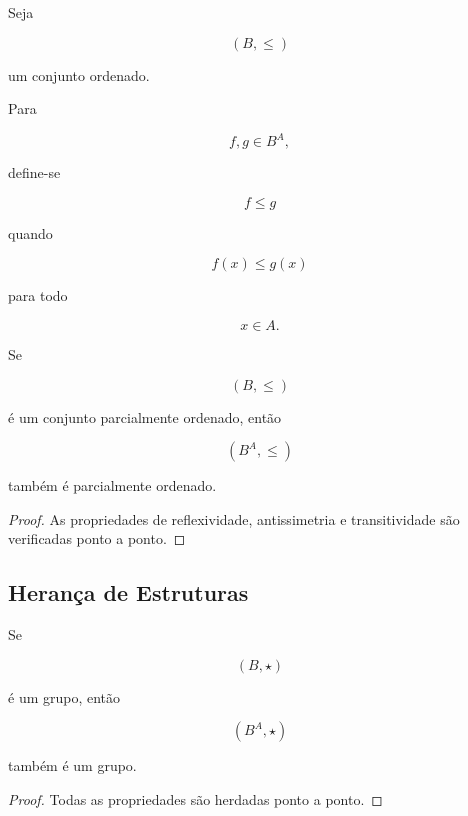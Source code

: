 \documentclass[../../main]{subfiles}
\begin{document}
\begin{defn}
	\label{def:matematica:funcoes:operacoes:ordem}

	Seja

	\[
		(B,\le)
	\]

	um conjunto ordenado.

	Para

	\[
		f,g\in B^A,
	\]

	define-se

	\[
		f\le g
	\]

	quando

	\[
		f(x)\le g(x)
	\]

	para todo

	\[
		x\in A.
	\]

\end{defn}

\begin{prop}
	\label{prop:matematica:funcoes:operacoes:ordem-parcial}

	Se

	\[
		(B,\le)
	\]

	é um conjunto parcialmente ordenado, então

	\[
		(B^A,\le)
	\]

	também é parcialmente ordenado.

\end{prop}

\begin{proof}

	As propriedades de reflexividade, antissimetria e transitividade são
	verificadas ponto a ponto.

\end{proof}

\subsection{Herança de Estruturas}

\begin{prop}
	\label{prop:matematica:funcoes:operacoes:grupo}

	Se

	\[
		(B,\star)
	\]

	é um grupo, então

	\[
		(B^A,\star)
	\]

	também é um grupo.

\end{prop}

\begin{proof}

	Todas as propriedades são herdadas ponto a ponto.

\end{proof}
\end{document}
